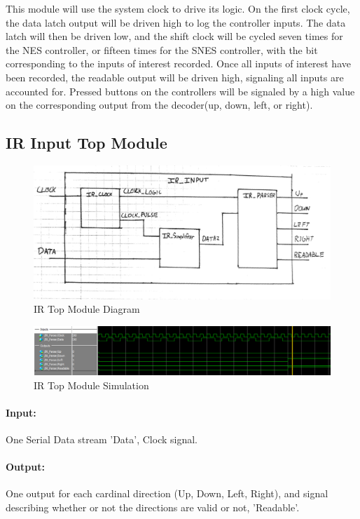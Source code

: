 \documentclass[]{article}
\begin{document}
This module will use the system clock to drive its logic. On the first clock cycle, the data latch output will be driven high to log the controller inputs. The data latch will then be driven low, and the shift clock will be cycled seven times for the NES controller, or fifteen times for the SNES controller, with the bit corresponding to the inputs of interest recorded. Once all inputs of interest have been recorded, the readable output will be driven high, signaling all inputs are accounted for. Pressed buttons on the controllers will be signaled by a high value on the corresponding output from the decoder(up, down, left, or right). 

\subsection{IR Input Top Module}
\begin{figure}[H]\centering
    \includegraphics[width=\linewidth]{figures/IR_Input_Block.jpg}
    \caption{IR Top Module Diagram}
    \label{fig:irInputDecoderBlock}
\end{figure}
\begin{figure}[H]\centering
    \includegraphics[width=\linewidth]{figures/IR_Input_Sim.PNG}
    \caption{IR Top Module Simulation}
    \label{fig:irInputDecoderSim}
\end{figure}
\paragraph{Input:} One Serial Data stream 'Data', Clock signal.
\paragraph{Output:} One output for each cardinal direction (Up, Down, Left, Right), and signal describing whether or not the directions are valid or not, 'Readable'.
\end{document}
